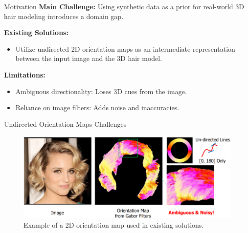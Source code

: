 
\begin{frame}[t]{Motivation}
    \textbf{Main Challenge:} Using synthetic data as a prior for real-world 3D hair modeling introduces a domain gap.

    \vspace{1em}
    \textbf{Existing Solutions:} 
    \begin{itemize}
        \item Utilize undirected 2D orientation maps as an intermediate representation between the input image and the 3D hair model.
    \end{itemize}

    \vspace{1em}
    \textbf{Limitations:}
    \begin{itemize}
        \item Ambiguous directionality: Loses 3D cues from the image.
        \item Reliance on image filters: Adds noise and inaccuracies.
    \end{itemize}
\end{frame}

\begin{frame}{Undirected Orientation Maps Challenges}
    \begin{figure}
        \centering
        \includegraphics[width=0.9\linewidth]{assets/figures/motivations/orientation-map.png}
        \caption{Example of a 2D orientation map used in existing solutions.}
        \label{fig:motivation-orientation-map}
    \end{figure}
\end{frame}
